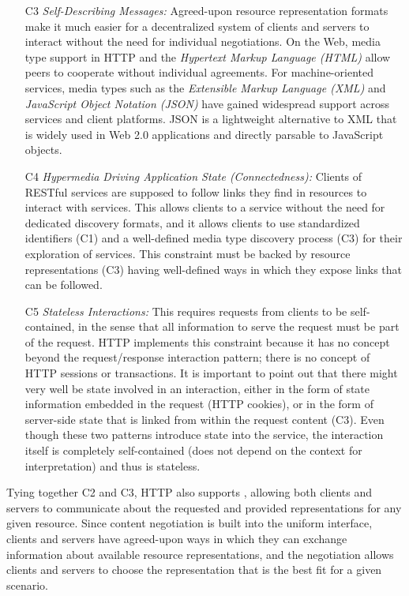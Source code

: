\begin{itemize}
\item[C3] \emph{Self-Describing Messages:} Agreed-upon resource representation formats make it much easier for a decentralized system of clients and servers to interact without the need for individual negotiations. On the Web, media type support in HTTP and the \emph{Hypertext Markup Language (HTML)} allow peers to cooperate without individual agreements. For machine-oriented services, media types such as the \emph{Extensible Markup Language (XML)} and \emph{JavaScript Object Notation (JSON)} have gained widespread support across services and client platforms. JSON is a lightweight alternative to XML that is widely used in Web 2.0 applications and directly parsable to JavaScript objects.

\item[C4] \emph{Hypermedia Driving Application State (Connectedness):} Clients of RESTful services are supposed to follow links they find in resources to interact with services. This allows clients to  a service without the need for dedicated discovery formats, and it allows clients to use standardized identifiers (C1) and a well-defined media type discovery process (C3) for their exploration of services. This constraint must be backed by resource representations (C3) having well-defined ways in which they expose links that can be followed.

\item[C5] \emph{Stateless Interactions:} This requires requests from clients to be self-contained, in the sense that all information to serve the request must be part of the request. HTTP implements this constraint because it has no concept beyond the request/response interaction pattern; there is no concept of HTTP sessions or transactions. It is important to point out that there might very well be state involved in an interaction, either in the form of state information embedded in the request (HTTP cookies), or in the form of server-side state that is linked from within the request content (C3). Even though these two patterns introduce state into the service, the interaction itself is completely self-contained (does not depend on the context for interpretation) and thus is stateless.

\end{itemize}

Tying together C2 and C3, HTTP also supports , allowing both clients and servers to communicate about the requested and provided representations for any given resource. Since content negotiation is built into the uniform interface, clients and servers have agreed-upon ways in which they can exchange information about available resource representations, and the negotiation allows clients and servers to choose the representation that is the best fit for a given scenario.

